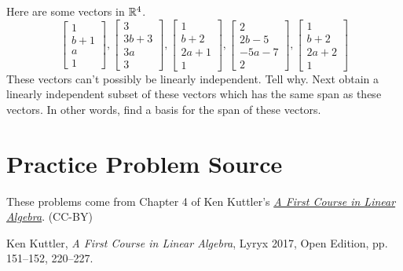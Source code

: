 \documentclass{ximera}
\begin{document}
\begin{problem}\label{prb:3.35} Here are some vectors in $\mathbb{R}^{4}$.
\begin{equation*}
\left[
\begin{array}{r}
1 \\
b+1 \\
a \\
1
\end{array}
\right] ,\left[
\begin{array}{r}
3 \\
3b+3 \\
3a \\
3
\end{array}
\right] ,\left[
\begin{array}{r}
1 \\
b+2 \\
2a+1 \\
1
\end{array}
\right] ,\left[
\begin{array}{r}
2 \\
2b-5 \\
-5a-7 \\
2
\end{array}
\right] ,\left[
\begin{array}{r}
1 \\
b+2 \\
2a+2 \\
1
\end{array}
\right]
\end{equation*}
These vectors can't possibly be linearly independent. Tell why. Next obtain a
linearly independent subset of these vectors which has the same span as
these vectors. In other words, find a basis for the span of these vectors.
\end{problem}


\section*{Practice Problem Source}
These problems come from Chapter 4 of Ken Kuttler's \href{https://open.umn.edu/opentextbooks/textbooks/a-first-course-in-linear-algebra-2017}{\it A First Course in Linear Algebra}. (CC-BY)

Ken Kuttler, {\it  A First Course in Linear Algebra}, Lyryx 2017, Open Edition, pp. 151--152, 220--227.  
\end{document}

